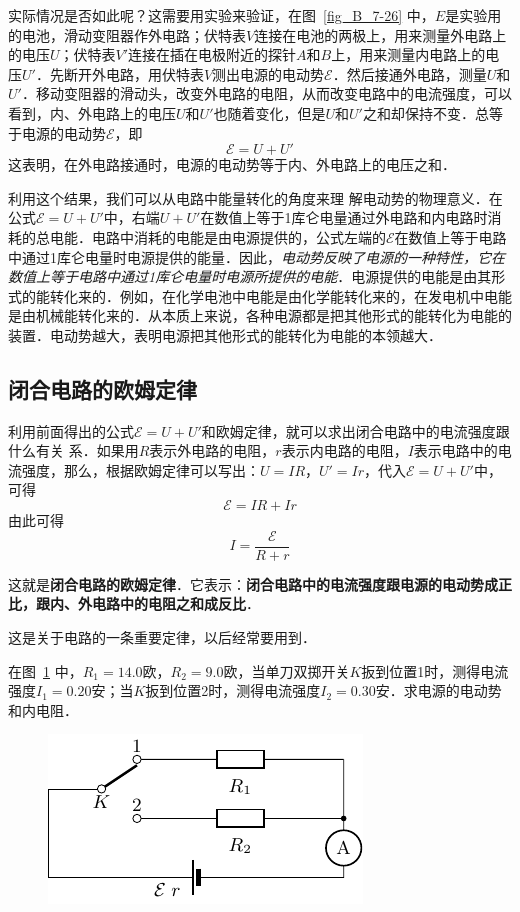 实际情况是否如此呢？这需要用实验来验证，在图~\ref{fig_B_7-26} 中，$E$是实验用的电池，滑动变阻器作外电路；伏特表$V$连接在电池的两极上，用来测量外电路上的电压$U$；伏特表$V'$连接在插在电极附近的探针$A$和$B$上，用来测量内电路上的电压$U'$．先断开外电路，用伏特表$V$测出电源的电动势$\mathcal{E}$．然后接通外电路，测量$U$和$U'$．移动变阻器的滑动头，改变外电路的电阻，从而改变电路中的电流强度，可以看到，内、外电路上的电压$U$和$U'$也随着变化，但是$U$和$U'$之和却保持不变．总等于电源的电动势$\mathcal{E}$，即
\[\mathcal{E}=U+U'\]
这表明，在外电路接通时，电源的电动势等于内、外电路上的电压之和．

利用这个结果，我们可以从电路中能量转化的角度来理
解电动势的物理意义．在公式$\mathcal{E}=U+U'$中，右端$U+U'$在数值上等于1库仑电量通过外电路和内电路时消耗的总电能．电路中消耗的电能是由电源提供的，公式左端的$\mathcal{E}$在数值上等于电路中通过1库仑电量时电源提供的能量．因此，\textit{电动势反映了电源的一种特性，它在数值上等于电路中通过1库仑电量时电源所提供的电能}．电源提供的电能是由其形式的能转化来的．例如，在化学电池中电能是由化学能转化来的，在发电机中电能是由机械能转化来的．从本质上来说，各种电源都是把其他形式的能转化为电能的装置．电动势越大，表明电源把其他形式的能转化为电能的本领越大．

\subsection{闭合电路的欧姆定律}

利用前面得出的公式$\mathcal{E}=U+U'$和欧姆定律，就可以求出闭合电路中的电流强度跟什么有关
系．如果用$R$表示外电路的电阻，$r$表示内电路的电阻，$I$表示电路中的电流强度，那么，根据欧姆定律可以写出：$U=IR$，$U'=Ir$，代入$\mathcal{E}=U+U'$中，可得
\[\mathcal{E}=IR+Ir \]
由此可得
\[I=\frac{\mathcal{E}}{R+r} \]

这就是\textbf{闭合电路的欧姆定律}．它表示：\textbf{闭合电路中的电流强度跟电源的电动势成正比，跟内、外电路中的电阻之和成反比}．

这是关于电路的一条重要定律，以后经常要用到．

\begin{example}
在图~\ref{fig_B_7-27} 中，$R_1=14.0$欧，$R_2=9.0$欧，当单刀双掷开关$K$扳到位置1时，测得电流强度$I_1=0.20$安；当$K$扳到位置2时，测得电流强度$I_2=0.30$安．求电源的电动势和内电阻．
\end{example}
\begin{figure}[htbp]
    \centering
    \includegraphics{fig/B/7-27.pdf}
    \caption{}\label{fig_B_7-27}
\end{figure}


